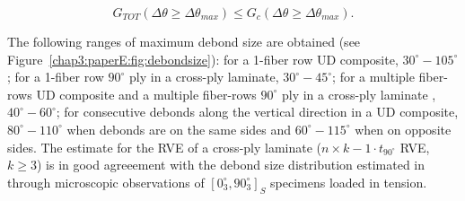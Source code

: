 \begin{equation}\label{paperE:eq:debmax}
G_{TOT}\left(\Delta\theta\geq\Delta\theta_{max}\right)\leq G_{c}\left(\Delta\theta\geq\Delta\theta_{max}\right).
\end{equation}

The following ranges of maximum debond size are obtained (see Figure~\ref{chap3:paperE:fig:debondsize}): for a 1-fiber row UD composite, $30^{\circ}-105^{\circ}$; for a 1-fiber row $90^{\circ}$ ply in a cross-ply laminate, $30^{\circ}-45^{\circ}$; for a multiple fiber-rows UD composite and a multiple fiber-rows $90^{\circ}$ ply in a cross-ply laminate , $40^{\circ}-60^{\circ}$; for consecutive debonds along the vertical direction in a UD composite, $80^{\circ}-110^{\circ}$ when debonds are on the same sides and $60^{\circ}-115^{\circ}$ when on opposite sides. The estimate for the RVE of a cross-ply laminate ($n\times k-1\cdot t_{90^{\circ}}$ RVE, $k\geq3$) is in good agreeement with the debond size distribution estimated in~\cite{Correa2018} through microscopic observations of $\left[0^{\circ}_{3},90^{\circ}_{3}\right]_{S}$ specimens loaded in tension.
